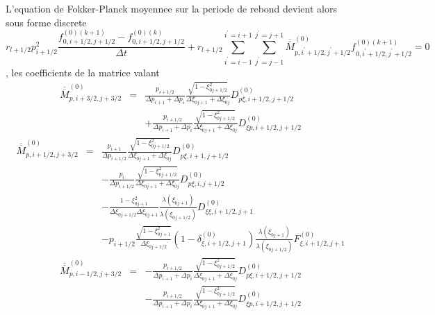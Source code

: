 L'equation de Fokker-Planck moyennee sur la periode de rebond devient
alors sous forme discrete \[
r_{l+1/2}p_{i+1/2}^{2}\frac{f_{0,i+1/2,j+1/2}^{\left(0\right)\left(k+1\right)}-f_{0,i+1/2,j+1/2}^{\left(0\right)\left(k\right)}}{\Delta t}+r_{l+1/2}\sum_{i^{\prime}=i-1}^{i^{\prime}=i+1}\sum_{j^{\prime}=j-1}^{j^{\prime}=j+1}\overline{\overline{M}}_{p,i^{\prime}+1/2,j^{\prime}+1/2}^{\left(0\right)}f_{0,i^{\prime}+1/2,j^{\prime}+1/2}^{\left(0\right)(k+1)}=0\]
 , les coefficients de la matrice valant \begin{eqnarray*}
\overline{\overline{M}}_{p,i+3/2,j+3/2}^{\left(0\right)} & = & \frac{p_{i+1/2}}{\Delta p_{i+1}+\Delta p_{i}}\frac{\sqrt{1-\xi_{0j+1/2}^{2}}}{\Delta\xi_{0j+1}+\Delta\xi_{0j}}D_{p\xi,i+1/2,j+1/2}^{\left(0\right)}\\
 &  & +\frac{p_{i+1/2}}{\Delta p_{i+1}+\Delta p_{i}}\frac{\sqrt{1-\xi_{0j+1/2}^{2}}}{\Delta\xi_{0j+1}+\Delta\xi_{0j}}D_{\xi p,i+1/2,j+1/2}^{\left(0\right)}\end{eqnarray*}
\begin{eqnarray*}
\overline{\overline{M}}_{p,i+1/2,j+3/2}^{\left(0\right)} & = & \frac{p_{i+1}}{\Delta p_{i+1/2}}\frac{\sqrt{1-\xi_{0j+1/2}^{2}}}{\Delta\xi_{0j+1}+\Delta\xi_{0j}}D_{p\xi,i+1,j+1/2}^{\left(0\right)}\\
 &  & -\frac{p_{i}}{\Delta p_{i+1/2}}\frac{\sqrt{1-\xi_{0j+1/2}^{2}}}{\Delta\xi_{0j+1}+\Delta\xi_{0j}}D_{p\xi,i,j+1/2}^{\left(0\right)}\\
 &  & -\frac{1-\xi_{0j+1}^{2}}{\Delta\xi_{0j+1/2}\Delta\xi_{0j+1}}\frac{\lambda\left(\xi_{0j+1}\right)}{\lambda\left(\xi_{0j+1/2}\right)}D_{\xi\xi,i+1/2,j+1}^{\left(0\right)}\\
 &  & -p_{i+1/2}\frac{\sqrt{1-\xi_{0j+1}^{2}}}{\Delta\xi_{0j+1/2}}\left(1-\delta_{\xi,i+1/2,j+1}^{\left(0\right)}\right)\frac{\lambda\left(\xi_{0j+1}\right)}{\lambda\left(\xi_{0j+1/2}\right)}F_{\xi,i+1/2,j+1}^{\left(0\right)}\end{eqnarray*}
\begin{eqnarray*}
\overline{\overline{M}}_{p,i-1/2,j+3/2}^{\left(0\right)} & = & -\frac{p_{i+1/2}}{\Delta p_{i+1}+\Delta p_{i}}\frac{\sqrt{1-\xi_{0j+1/2}^{2}}}{\Delta\xi_{0j+1}+\Delta\xi_{0j}}D_{p\xi,i+1/2,j+1/2}^{\left(0\right)}\\
 &  & -\frac{p_{i+1/2}}{\Delta p_{i+1}+\Delta p_{i}}\frac{\sqrt{1-\xi_{0j+1/2}^{2}}}{\Delta\xi_{0j+1}+\Delta\xi_{0j}}D_{\xi p,i+1/2,j+1/2}^{\left(0\right)}\end{eqnarray*}
